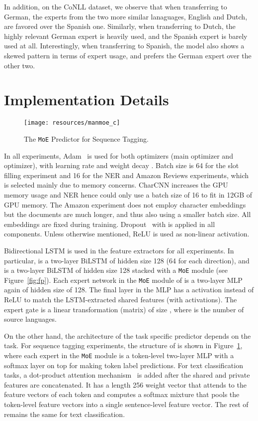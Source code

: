 \documentclass[11pt,a4paper]{article}
\newcommand{\moe}{\texttt{MoE}}
\begin{document}
In addition, on the CoNLL dataset, we observe that when transferring to German, the experts from the two more similar lanaguages, English and Dutch, are favored over the Spanish one.
Similarly, when transferring to Dutch, the highly relevant German expert is heavily used, and the Spanish expert is barely used at all.
Interestingly, when transferring to Spanish, the model also shows a skewed pattern in terms of expert usage, and prefers the German expert over the other two. \section{Implementation Details}\label{sec:implementation}

\begin{figure}
    \centering
    \texttt{[image: resources/manmoe\_c]}
    \caption{The \moe{} Predictor  for Sequence Tagging.}
    \label{fig:c}
\end{figure}
 
In all experiments, Adam~\cite{kingma2014adam} is used for both optimizers (main optimizer and  optimizer), with learning rate  and weight decay .
Batch size is 64 for the slot filling experiment and 16 for the NER and Amazon Reviews experiments, which is selected mainly due to memory concerns.
CharCNN increases the GPU memory usage and NER hence could only use a batch size of 16 to fit in 12GB of GPU memory.
The Amazon experiment does not employ character embeddings but the documents are much longer, and thus also using a smaller batch size.
All embeddings are fixed during training.
Dropout~\cite{JMLR:v15:srivastava14a} with  is applied in all components.
Unless otherwise mentioned, ReLU is used as non-linear activation.

Bidirectional LSTM is used in the feature extractors for all experiments.
In particular,  is a two-layer BiLSTM of hidden size 128 (64 for each direction), and  is a two-layer BiLSTM of hidden size 128 stacked with a \moe{} module (see Figure~\ref{fig:fp}).
Each expert network in the \moe{} module of  is a two-layer MLP again of hidden size of 128.
The final layer in the MLP has a  activation instead of ReLU to match the LSTM-extracted shared features (with  activations).
The expert gate is a linear transformation (matrix) of size , where  is the number of source languages.

On the other hand, the architecture of the task specific predictor  depends on the task.
For sequence tagging experiments, the structure of  is shown in Figure~\ref{fig:c}, where each expert in the \moe{} module is a token-level two-layer MLP with a softmax layer on top for making token label predictions.
For text classification tasks, a dot-product attention mechanism~\cite{D15-1166} is added after the shared and private features are concatenated.
It has a length 256 weight vector that attends to the feature vectors of each token and computes a softmax mixture that pools the token-level feature vectors into a single sentence-level feature vector.
The rest of  remains the same for text classification.
\end{document}
